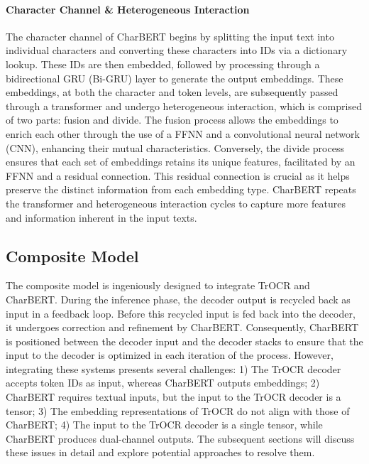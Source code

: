 \paragraph*{Character Channel \& Heterogeneous Interaction}
\label{par:3_character_channel_heterogeneous_interaction}
The character channel of CharBERT begins by splitting the input text into individual characters and converting these characters into IDs via a dictionary lookup. These IDs are then embedded, followed by processing through a bidirectional GRU (Bi-GRU) layer to generate the output embeddings. These embeddings, at both the character and token levels, are subsequently passed through a transformer and undergo heterogeneous interaction, which is comprised of two parts: fusion and divide. The fusion process allows the embeddings to enrich each other through the use of a FFNN and a convolutional neural network (CNN), enhancing their mutual characteristics. Conversely, the divide process ensures that each set of embeddings retains its unique features, facilitated by an FFNN and a residual connection. This residual connection is crucial as it helps preserve the distinct information from each embedding type. CharBERT repeats the transformer and heterogeneous interaction cycles to capture more features and information inherent in the input texts.

\subsection{Composite Model}
\label{subsec:3_composite_model}
The composite model is ingeniously designed to integrate TrOCR and CharBERT. During the inference phase, the decoder output is recycled back as input in a feedback loop. Before this recycled input is fed back into the decoder, it undergoes correction and refinement by CharBERT. Consequently, CharBERT is positioned between the decoder input and the decoder stacks to ensure that the input to the decoder is optimized in each iteration of the process. However, integrating these systems presents several challenges: 1) The TrOCR decoder accepts token IDs as input, whereas CharBERT outputs embeddings; 2) CharBERT requires textual inputs, but the input to the TrOCR decoder is a tensor; 3) The embedding representations of TrOCR do not align with those of CharBERT; 4) The input to the TrOCR decoder is a single tensor, while CharBERT produces dual-channel outputs. The subsequent sections will discuss these issues in detail and explore potential approaches to resolve them.

